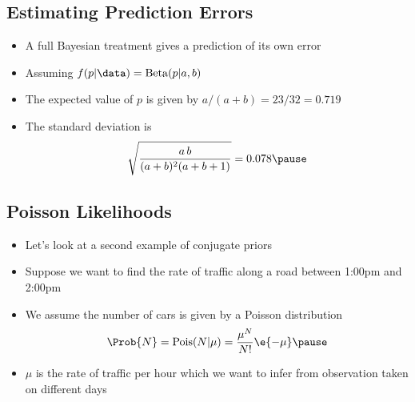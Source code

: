 \begin{slide}
\section{Estimating Prediction Errors}

\begin{PauseHighLight}
  \begin{itemize}
  \item A full Bayesian treatment gives a prediction of its own
    error\pause
  \item Assuming $f(p|\data) = \mathrm{Beta}(p|a,b)$
  \item The expected value of $p$ is given by $a/(a+b) = 23/32 = 0.719$\pause
  \item The standard deviation is
    \begin{align*}
      \sqrt{\frac{a\,b}{(a+b)^2(a+b+1)}} = 0.078\pause
    \end{align*}
  \end{itemize}
\end{PauseHighLight}

\end{slide}

\begin{slide}
\section{Poisson Likelihoods}

\begin{PauseHighLight}
  \begin{itemize}
  \item Let's look at a second example of conjugate priors\pause
  \item Suppose we want to find the rate of traffic along a road between
    1:00pm and 2:00pm\pause
  \item We assume the number of cars is given by a Poisson distribution
    \begin{align*}
      \Prob{N} = \mathrm{Pois}(N|\mu) = \frac{\mu^N}{N!} \e{-\mu}\pause
    \end{align*}
  \item $\mu$ is the rate of traffic per hour which we want to infer
    from observation taken on different days\pause
  \end{itemize}
\end{PauseHighLight}

\end{slide}


